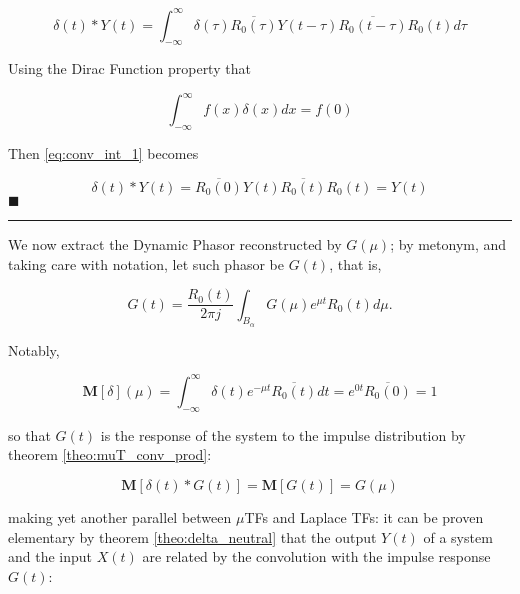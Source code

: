 \begin{equation}
	\delta(t) \ast Y(t) = \int_{-\infty}^{\infty} \delta\left(\tau\right) \overline{R_0\left(\tau\right)}Y\left(t - \tau\right)\overline{R_0\left(t - \tau\right)} R_0\left(t\right)  d\tau \label{eq:conv_int_1}
\end{equation}

	Using the Dirac Function property that

\begin{equation}
	\int_{-\infty}^{\infty} f(x)\delta(x)dx = f(0)
\end{equation}

	Then \eqref{eq:conv_int_1} becomes

\begin{equation}
	\delta(t) \ast Y(t) = \overline{R_0\left(0\right)}Y\left(t\right)\overline{R_0\left(t\right)} R_0\left(t\right) = Y(t)
\end{equation}
\hfill$\blacksquare$\vspace{5mm}\hrule\vspace{5mm}%

	We now extract the Dynamic Phasor reconstructed by $G\left(\mu\right)$; by metonym, and taking care with notation, let such phasor be $G(t)$, that is,

\begin{equation} G(t) = \dfrac{R_0(t)}{2\pi j}\int_{B_\alpha} G\left(\mu\right) e^{\mu  t} R_0\left(t\right) d\mu .\end{equation}

	Notably,

\begin{equation} \mathbf{M}\left[\delta\right]\left(\mu\right) = \int_{-\infty}^{\infty} \delta(t) e^{-\mu t} \overline{R_0(t)}dt = e^{0 t} \overline{R_0(0)} = 1 \end{equation}

	\noindent so that $G(t)$ is the response of the system to the impulse distribution by theorem \ref{theo:muT_conv_prod}:

\begin{equation} \mathbf{M}\left[\delta(t) \ast G(t)\right] = \mathbf{M}\left[G(t)\right] = G\left(\mu\right)\end{equation}

	\noindent making yet another parallel between $\mu$TFs and Laplace TFs: it can be proven elementary by theorem \ref{theo:delta_neutral} that the output $Y(t)$ of a system and the input $X(t)$ are related by the convolution with the impulse response $G(t)$:

